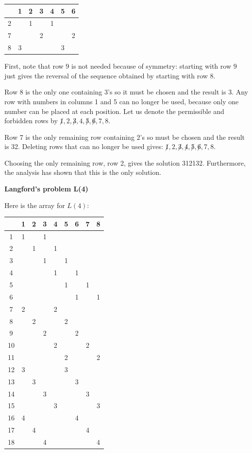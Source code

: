 \documentclass[11pt,a4paper]{report}
\begin{document}
\begin{center}
\begin{tabular}{|c||c|c|c|c|c|c|}
\hline
&1&2&3&4&5&6\\\hline\hline
2&&1&&1&&\\\hline
7&&&2&&&2\\\hline
8&3&&&&3&\\\hline
\end{tabular}
\end{center}

First, note that row 9 is not needed because of symmetry: starting with row 9 just gives the reversal of the  sequence obtained by starting with row 8.

Row 8 is the only one containing $3$'s so it must be chosen and the result is 3\textvisiblespace \textvisiblespace {}\textvisiblespace. Any row with numbers in columns 1 and 5 can no longer be used, because only one number can be placed at each position. Let us denote the permissible and forbidden rows by $\not 1,2,\not 3,4,\not 5, \not 6, 7, 8$.

Row 7 is the only remaining row containing $2$'s so must be chosen and the result is 32. Deleting rows that can no longer be used gives: $\not 1,2,\not 3,\not 4,\not 5, \not 6, 7, 8$.

Choosing the only remaining row, row 2, gives the solution 3{}1{}2{}1{}3{}2. Furthermore, the analysis has shown that this is the only solution.


\begin{center}
\textbf{\Large Langford's problem L(4)}
\end{center}

Here is the array for $L(4)$:
\begin{center}
\begin{tabular}{|c||c|c|c|c|c|c|c|c|}
\hline
&1&2&3&4&5&6&7&8\\\hline\hline
1&1&&1&&&&&\\\hline
2&&1&&1&&&&\\\hline
3&&&1&&1&&&\\\hline
4&&&&1&&1&&\\\hline
5&&&&&1&&1&\\\hline
6&&&&&&1&&1\\\hline
7&2&&&2&&&&\\\hline
8&&2&&&2&&&\\\hline
9&&&2&&&2&&\\\hline
10&&&&2&&&2&\\\hline
11&&&&&2&&&2\\\hline
12&3&&&&3&&&\\\hline
13&&3&&&&3&&\\\hline
14&&&3&&&&3&\\\hline
15&&&&3&&&&3\\\hline
16&4&&&&&4&&\\\hline
17&&4&&&&&4&\\\hline
18&&&4&&&&&4\\\hline
\end{tabular}
\end{center}
\end{document}
